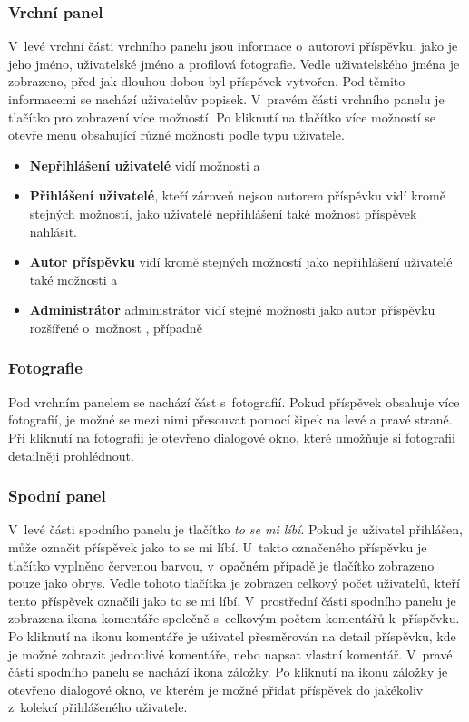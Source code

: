 \documentclass[12pt, a4paper,
  oneside,      %
]{report}
\begin{document}
\subsubsection{Vrchní panel}
V~levé vrchní části vrchního panelu jsou informace o~autorovi příspěvku, jako je jeho jméno, uživatelské jméno a profilová fotografie. Vedle uživatelského jména je zobrazeno, před jak dlouhou dobou byl příspěvek vytvořen. Pod těmito informacemi se nachází uživatelův popisek. V~pravém části vrchního panelu je tlačítko pro zobrazení více možností. Po kliknutí na tlačítko více možností se otevře menu obsahující různé možnosti podle typu uživatele.
\begin{itemize}
    \item \textbf{Nepřihlášení uživatelé} vidí možnosti  a 
    \item \textbf{Přihlášení uživatelé}, kteří zároveň nejsou autorem příspěvku vidí kromě stejných možností, jako uživatelé nepřihlášení také možnost příspěvek nahlásit.
    \item \textbf{Autor příspěvku} vidí kromě stejných možností jako nepřihlášení uživatelé také možnosti  a 
    \item \textbf{Administrátor} administrátor vidí stejné možnosti jako autor příspěvku rozšířené o~možnost , případně 
\end{itemize}
\subsubsection{Fotografie}
Pod vrchním panelem se nachází část s~fotografií. Pokud příspěvek obsahuje více fotografií, je možné se mezi nimi přesouvat pomocí šipek na levé a pravé straně. Při kliknutí na fotografii je otevřeno dialogové okno, které umožňuje si fotografii detailněji prohlédnout. 
\subsubsection{Spodní panel}
V~levé části spodního panelu je tlačítko \textit{to se mi líbí}. Pokud je uživatel přihlášen, může označit příspěvek jako to se mi líbí. U~takto označeného příspěvku je tlačítko vyplněno červenou barvou, v~opačném případě je tlačítko zobrazeno pouze jako obrys. Vedle tohoto tlačítka je zobrazen celkový počet uživatelů, kteří tento příspěvek označili jako to se mi líbí. V~prostřední části spodního panelu je zobrazena ikona komentáře společně s~celkovým počtem komentářů k~příspěvku. Po kliknutí na ikonu komentáře je uživatel přesměrován na detail příspěvku, kde je možné zobrazit jednotlivé komentáře, nebo napsat vlastní komentář. V~pravé části spodního panelu se nachází ikona záložky. Po kliknutí na ikonu záložky je otevřeno dialogové okno, ve kterém je možné přidat příspěvek do jakékoliv z~kolekcí přihlášeného uživatele.
\end{document}
